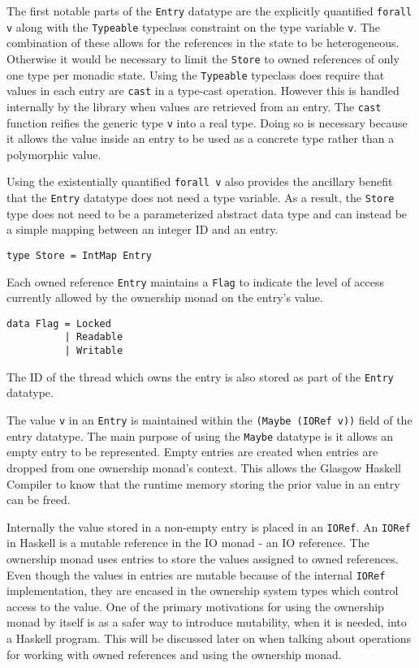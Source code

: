\documentclass[onehalf,11pt]{beavtex}
\begin{document}
The first notable parts of the \texttt{Entry} datatype are the explicitly
quantified \texttt{forall v} along with the \texttt{Typeable} typeclass
constraint on the type variable \texttt{v}.
The combination of these allows for the references in the state to be
heterogeneous.
Otherwise it would be necessary to limit the \texttt{Store} to owned
references of only one type per monadic state. %
Using the \texttt{Typeable} typeclass does require that values in each entry are
\texttt{cast} in a type-cast operation.  However this is handled internally
by the library when values are retrieved from an entry.
The \texttt{cast} function reifies the generic type \texttt{v} into a real
type.
Doing so is necessary because it allows the value inside an entry to be used
as a concrete type rather than a polymorphic value.

Using the existentially quantified \texttt{forall v} also provides the
ancillary benefit that the \texttt{Entry} datatype does not need a type
variable.
As a result, the \texttt{Store} type does not need to be a parameterized abstract
data type and can instead be a simple mapping between an integer ID and an entry.

\begin{verbatim}
type Store = IntMap Entry
\end{verbatim}

Each owned reference \texttt{Entry} maintains a \texttt{Flag} to indicate the
level of access currently allowed by the ownership monad on the entry's value.

\begin{verbatim}
data Flag = Locked
          | Readable
          | Writable
\end{verbatim}

The ID of the thread which owns the entry is also stored as part of the
\texttt{Entry} datatype. 

The value \texttt{v} in an \texttt{Entry} is maintained within the
\texttt{(Maybe (IORef v))} field of the entry datatype.
The main purpose of using the \texttt{Maybe} datatype is it allows an empty entry
to be represented.
Empty entries are created when entries are dropped from one ownership monad's
context.  This allows the Glasgow Haskell Compiler to know that
the runtime memory storing the prior value in an entry can be freed.

Internally the value stored in a non-empty entry is placed in an \texttt{IORef}.
An \texttt{IORef} in Haskell is a mutable reference in the IO monad - an IO
reference.
The ownership monad uses entries to store the values assigned to owned
references.
Even though the values in entries are mutable because of the internal \texttt{IORef}
implementation, they are encased in the ownership system types which control
access to the value.
One of the primary motivations for using the ownership monad by itself is as a
safer way to introduce mutability, when it is needed, into a Haskell program.
This will be discussed later on when talking about operations for working with
owned references and using the ownership monad.
\end{document}
